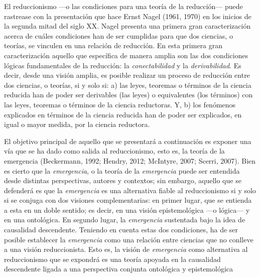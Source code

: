\documentclass[]{book}
\begin{document}
\begin{refsection}
El reduccionismo ---o las condiciones para una teoría de la reducción---
puede rastrease con la presentación que hace Ernst Nagel (1961, 1970) en
los inicios de la segunda mitad del siglo XX. Nagel presenta una primera
gran caracterización acerca de cuáles condiciones han de ser cumplidas
para que dos ciencias, o teorías, se vinculen en una relación de
reducción. En esta primera gran caracterización aquello que específica
de manera amplia son las dos condiciones lógicas fundamentales de la
reducción: la \emph{conectabilidad} y la \emph{derivabilidad}. Es decir,
desde una visión amplia, es posible realizar un proceso de reducción
entre dos ciencias, o teorías, si y solo si: a) las leyes, teoremas o
términos de la ciencia reducida han de poder ser derivables (las leyes)
o equivalentes (los términos) con las leyes, teoremas o términos de la
ciencia reductoras. Y, b) los fenómenos explicados en términos de la
ciencia reducida han de poder ser explicados, en igual o mayor medida,
por la ciencia reductora.

El objetivo principal de aquello que se presentará a continuación es
exponer una vía que se ha dado como salida al reduccionismo, esto es, la
teoría de la emergencia (Beckermann, 1992; Hendry, 2012; McIntyre, 2007;
Scerri, 2007). Bien es cierto que la \emph{emergencia}, o la
teoría de la \emph{emergencia} puede ser entendida desde distintas
perspectivas, autores y contextos; sin embargo, aquello que se defenderá
es que la \emph{emergencia} es una alternativa fiable al reduccionismo
si y solo si se conjuga con dos visiones complementarias: en primer
lugar, que se entienda a esta en un doble sentido; es decir, en una
visión epistemológica ---o lógica--- y en una ontológica. En segundo
lugar, la \emph{emergencia} sustentada bajo la idea de causalidad
descendente. Teniendo en cuenta estas dos condiciones, ha de ser posible
establecer la \emph{emergencia} como una relación entre ciencias que no
conlleve a una visión reduccionista. Esto es, la visión de
\emph{emergencia} como alternativa al reduccionismo que se expondrá es
una teoría apoyada en la causalidad descendente ligada a una perspectiva
conjunta ontológica y epistemológica


\end{refsection}
\end{document}
